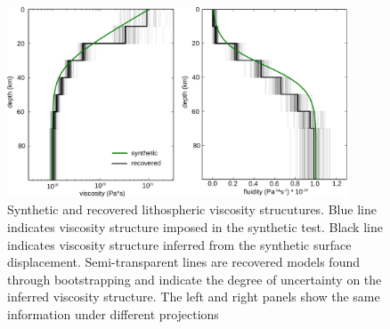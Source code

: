 \documentclass[extra]{gji}
\begin{document}
\begin{figure}[h!]\label{figure3}
  \centering
  \includegraphics[width=0.9\textwidth]{FinalFigures/Figure3.pdf}
  \caption{Synthetic and recovered lithospheric viscosity strucutures.
    Blue line indicates viscosity structure imposed in the synthetic
    test. Black line indicates viscosity structure inferred from the
    synthetic surface displacement.  Semi-transparent lines are
    recovered models found through bootstrapping and indicate the
    degree of uncertainty on the inferred viscosity structure.  The
    left and right panels show the same information under
    different projections}
  \label{figure 3}
\end{figure}
\end{document}

